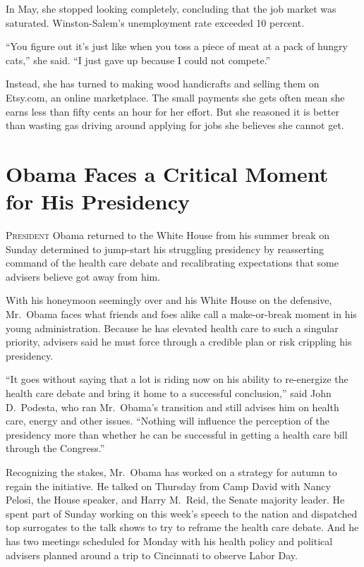 ﻿\documentclass[12pt]{article}
\begin{document}
In May, she stopped looking completely, concluding that the job market was saturated.
Winston-Salem's unemployment rate exceeded 10 percent.

``You figure out it's just like when you toss a piece of meat at a pack of hungry cats,'' she said.
``I just gave up because I could not compete.''

Instead, she has turned to making wood handicrafts and selling them on Etsy.com, an online
marketplace. The small payments she gets often mean she earns less than fifty cents an hour for her
effort. But she reasoned it is better than wasting gas driving around applying for jobs she believes
she cannot get.

\section{Obama Faces a Critical Moment for His Presidency}

\lettrine{P}{resident} Obama returned to the White House from his summer break on Sunday determined
to jump-start his struggling presidency by reasserting command of the health care debate and
recalibrating expectations that some advisers believe got away from him.

With his honeymoon seemingly over and his White House on the defensive, Mr.~Obama faces what friends
and foes alike call a make-or-break moment in his young administration. Because he has elevated
health care to such a singular priority, advisers said he must force through a credible plan or risk
crippling his presidency.

``It goes without saying that a lot is riding now on his ability to re-energize the health care
debate and bring it home to a successful conclusion,'' said John D.~Podesta, who ran Mr.~Obama's
transition and still advises him on health care, energy and other issues. ``Nothing will influence
the perception of the presidency more than whether he can be successful in getting a health care
bill through the Congress.''

Recognizing the stakes, Mr.~Obama has worked on a strategy for autumn to regain the initiative. He
talked on Thursday from Camp David with Nancy Pelosi, the House speaker, and Harry M.~Reid, the
Senate majority leader. He spent part of Sunday working on this week's speech to the nation and
dispatched top surrogates to the talk shows to try to reframe the health care debate. And he has two
meetings scheduled for Monday with his health policy and political advisers planned around a trip to
Cincinnati to observe Labor Day.
\end{document}
